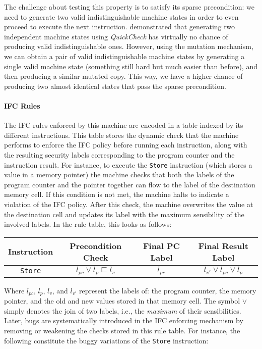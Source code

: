 \documentclass[sigconf,review,anonymous]{acmart}
\newcommand{\quickcheck}{\textit{QuickCheck}\xspace}
\begin{document}
The challenge about testing this property is to satisfy its sparse precondition:
we need to generate two valid indistinguishable machine states in order to even
proceed to execute the next instruction.
%
\citeauthor{lampropoulos2019coverage} demonstrated that generating two
independent machine states using \quickcheck has virtually no chance of
producing valid indistinguishable ones.
%
However, using the mutation mechanism, we can obtain a pair of valid
indistinguishable machine states by generating a single valid machine state
(something still hard but much easier than before), and then producing a similar
mutated copy.
%
This way, we have a higher chance of producing two almost identical states that
pass the sparse precondition.

\paragraph{IFC Rules}

The IFC rules enforced by this machine are encoded in a table indexed by its
different instructions.
%
This table stores the dynamic check that the machine performs to enforce the IFC
policy before running each instruction, along with the resulting security labels
corresponding to the program counter and the instruction result.
%
For instance, to execute the \texttt{Store} instruction (which stores a value in
a memory pointer) the machine checks that both the labels of the program counter
and the pointer together can flow to the label of the destination memory cell.
%
If this condition is not met, the machine halts to indicate a violation of the
IFC policy.
%
After this check, the machine overwrites the value at the destination cell and
updates its label with the maximum sensibility of the involved labels.
%
In the rule table, this looks as follows:

\begin{center}
\scriptsize
\begin{tabular}{|c|c|c|c|}
\hline
\textbf{Instruction} & \textbf{Precondition Check} & \textbf{Final PC Label} & \textbf{Final Result Label} \\
\hline
\texttt{Store}
& $l_{pc} \vee l_{p} \sqsubseteq l_{v}$ & $l_{pc}$ & $l_{v'} \vee l_{pc} \vee l_{p}$ \\
\hline
\end{tabular}
\end{center}

\noindent Where $l_{pc}$, $l_{p}$, $l_{v}$, and $l_{v'}$ represent the labels
of: the program counter, the memory pointer, and the old and new values stored in
that memory cell.
%
The symbol $\vee$ simply denotes the join of two labels, i.e., the
\emph{maximum} of their sensibilities.
%
Later, bugs are systematically introduced in the IFC enforcing mechanism by
removing or weakening the checks stored in this rule table.
%
For instance, the following constitute the buggy variations of the
\texttt{Store} instruction:
\end{document}
